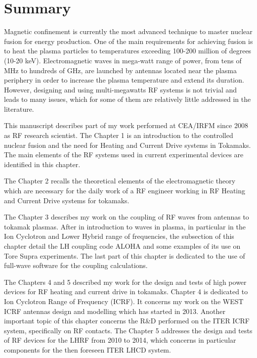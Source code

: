 \chapter*{Summary}

Magnetic confinement is currently the most advanced technique to master nuclear fusion for energy production. One of the main requirements for achieving fusion is to heat the plasma particles to temperatures exceeding 100-200 million of degrees (10-20 keV). Electromagnetic waves in mega-watt range of power, from tens of MHz to hundreds of GHz, are launched by antennas located near the plasma periphery in order to increase the plasma temperature and extend its duration. However, designing and using multi-megawatts RF systems is not trivial and leads to many issues, which for some of them  are relatively little addressed in the literature. 

This manuscript describes part of my work performed at CEA/IRFM since 2008 as RF research scientist. The Chapter 1 is an introduction to the controlled nuclear fusion and the need for Heating and Current Drive systems in Tokamaks. The main elements of the RF systems used in current experimental devices are identified in this chapter. 

The Chapter 2 recalls the theoretical elements of the electromagnetic theory which are necessary for the daily work of a RF engineer working in RF Heating and Current Drive systems for tokamaks. 

The Chapter 3 describes my work on the coupling of RF waves from antennas to tokamak plasmas. After in introduction to waves in plasma, in particular in the Ion Cyclotron and Lower Hybrid range of frequencies, the subsection of this chapter detail the LH coupling code ALOHA and some examples of its use on Tore Supra experiments. The last part of this chapter is dedicated to the use of full-wave software for the coupling calculations.

The Chapters 4 and 5 described my work for the design and tests of high power devices for RF heating and current drive in tokamaks. Chapter 4 is dedicated to Ion Cyclotron Range of Frequency (ICRF). It concerns my work on the WEST ICRF antennas design and modelling which has started in 2013. Another important topic of this chapter concerns the R\&D performed on the ITER ICRF system, specifically on RF contacts. The Chapter 5 addresses the design and tests of RF devices for the LHRF from 2010 to 2014, which concerns in particular components for the then foreseen ITER LHCD system.

